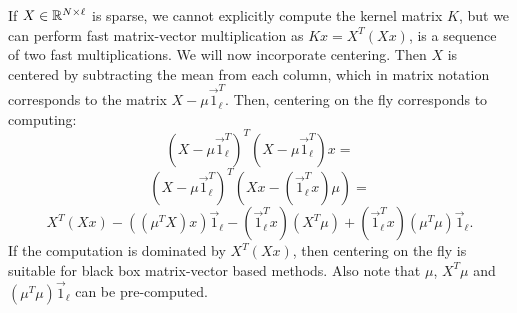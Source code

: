 If $X \in \mathbb{R}^{N \times \ell}$ is sparse, we cannot explicitly compute the kernel matrix
$K$, but we can perform fast matrix-vector multiplication as $K x = X^T(X x)$,
is a sequence of two fast multiplications. We will now incorporate centering.
Then $X$ is centered by subtracting the mean from each column, which in matrix notation corresponds to
the matrix $X - \mu \vec{1}_\ell^T$.
Then, centering on the fly corresponds to computing:
$$(X - \mu \vec{1}_\ell^T)^T (X - \mu \vec{1}_\ell^T) x =$$
$$(X - \mu \vec{1}_\ell^T)^T (X x - (\vec{1}_\ell^T x) \mu ) = $$
$$X^T (X x)  - ((\mu^T X) x) \vec{1}_\ell - (\vec{1}_\ell^T x) (X^T \mu)
+  (\vec{1}_\ell^T  x)(\mu^T \mu) \vec{1}_\ell .$$
If the computation is dominated by $X^T (X x)$, then centering on the fly is
suitable for black box matrix-vector based methods.
Also note that $\mu$, $X^T\mu$ and $(\mu^T \mu) \vec{1}_\ell$ can be pre-computed.
